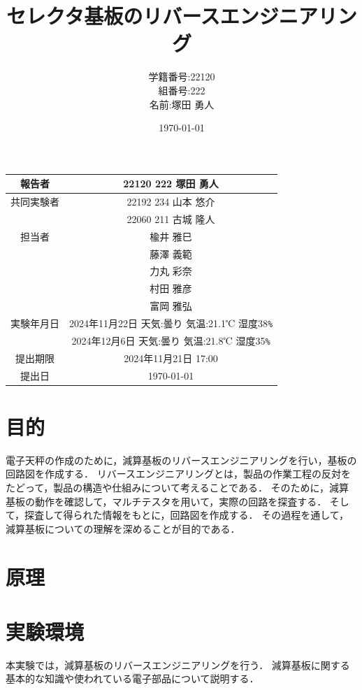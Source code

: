 \documentclass[a4paper,11pt,dvipdfmx]{jsarticle}
\begin{document}
\begin{table}[b]
  \centering
  \begin{tabular}{|c|c|}
    \hline
    報告者     & 22120 222 塚田 勇人 \\
    \hline
    共同実験者 & 22192 234 山本 悠介  \\ & 22060 211 古城 隆人\\
    \hline
    担当者     & 楡井 雅巳 \\
              &  藤澤 義範\\
    &力丸 彩奈\\
    &村田 雅彦\\
    &富岡 雅弘\\
    \hline
    実験年月日 & 2024年11月22日 天気:曇り 気温:21.1℃ 湿度38\verb#%#\\
    & 2024年12月6日 天気:曇り 気温:21.8℃ 湿度35\verb#%#\\
    \hline
    提出期限   & 2024年11月21日 17:00  \\
    \hline
    提出日     & \today              \\
    \hline
  \end{tabular}
\end{table}

\title{セレクタ基板のリバースエンジニアリング}
\author{学籍番号:22120 \\ 組番号:222 \\名前:塚田 勇人}
\date{\today}
\maketitle

\newpage

\section{目的}
電子天秤の作成のために，減算基板のリバースエンジニアリングを行い，基板の回路図を作成する．
リバースエンジニアリングとは，製品の作業工程の反対をたどって，製品の構造や仕組みについて考えることである．
そのために，減算基板の動作を確認して，マルチテスタを用いて，実際の回路を探査する．
そして，探査して得られた情報をもとに，回路図を作成する．
その過程を通して，減算基板についての理解を深めることが目的である．

\section{原理}

\section{実験環境}
本実験では，減算基板のリバースエンジニアリングを行う．
減算基板に関する基本的な知識や使われている電子部品について説明する．
\end{document}

